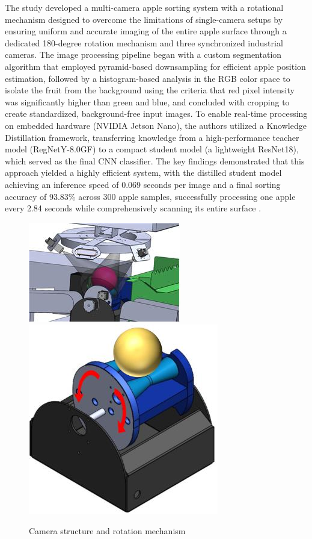 {The study developed a multi-camera apple sorting system with a rotational mechanism designed to overcome the limitations of single-camera setups by ensuring uniform and accurate imaging of the entire apple surface through a dedicated 180-degree rotation mechanism and three synchronized industrial cameras. The image processing pipeline began with a custom segmentation algorithm that employed pyramid-based downsampling for efficient apple position estimation, followed by a histogram-based analysis in the RGB color space to isolate the fruit from the background using the criteria that red pixel intensity was significantly higher than green and blue, and concluded with cropping to create standardized, background-free input images. To enable real-time processing on embedded hardware (NVIDIA Jetson Nano), the authors utilized a Knowledge Distillation framework, transferring knowledge from a high-performance teacher model (RegNetY-8.0GF) to a compact student model (a lightweight ResNet18), which served as the final CNN classifier. The key findings demonstrated that this approach yielded a highly efficient system, with the distilled student model achieving an inference speed of 0.069 seconds per image and a final sorting accuracy of 93.83\% across 300 apple samples, successfully processing one apple every 2.84 seconds while comprehensively scanning its entire surface \citep{lee2023multi}.

\begin{figure}[ht]
	\centering
	\includegraphics[width=0.45\linewidth]{figures/Lee2023_1} 
	\includegraphics[width=0.3\linewidth]{figures/Lee2023_2}
	\caption{Camera structure and rotation mechanism \citep{lee2023multi}}
	\label{fig:Lee2023}
\end{figure}

}
